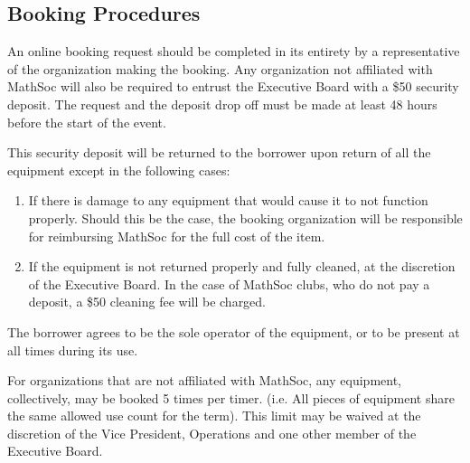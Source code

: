 \subsection{Booking Procedures}

An online booking request should be completed in its entirety by a
representative of the organization making the booking. Any organization not
affiliated with MathSoc will also be required to entrust the Executive Board
with a \$50 security deposit. The request and the deposit drop off must be made
at least 48 hours before the start of the event.

This security deposit will be returned to the borrower upon return of all the
equipment except in the following cases:

\begin{enumerate}
  \item If there is damage to any equipment that would cause it to not function
    properly. Should this be the case, the booking organization will be
    responsible for reimbursing MathSoc for the full cost of the item.
  \item If the equipment is not returned properly and fully cleaned, at the
    discretion of the Executive Board. In the case of MathSoc clubs, who do not
   pay a deposit, a \$50 cleaning fee will be charged.
\end{enumerate}

The borrower agrees to be the sole operator of the equipment, or to be present
at all times during its use.

For organizations that are not affiliated with MathSoc, any equipment,
collectively, may be booked 5 times per timer. (i.e. All pieces of equipment
share the same allowed use count for the term). This limit may be waived at the
discretion of the Vice President, Operations and one other member of the
Executive Board.
